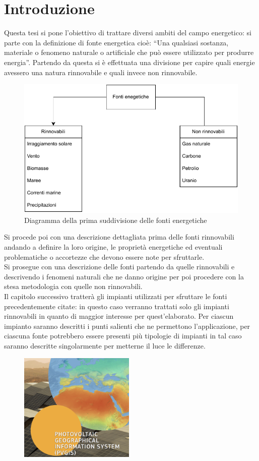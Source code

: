 
\chapter{Introduzione}
\label{chp:intro}
Questa tesi si pone l'obiettivo di trattare diversi ambiti del campo energetico: si parte con la definizione di fonte energetica cioè: \enquote{Una qualsiasi sostanza, materiale o fenomeno naturale o artificiale che può essere utilizzato per produrre energia}.
Partendo da questa si è effettuata una divisione per capire quali energie avessero una natura rinnovabile e quali invece non rinnovabile.
\begin{figure}[H]
    \centering
    \includegraphics[height=0.4\textwidth]{res/cap 1/diagramma intro}
    \caption{Diagramma della prima suddivisione delle fonti energetiche}
\end{figure}\noindent
Si procede poi con una descrizione dettagliata prima delle fonti rinnovabili andando a definire la loro origine, le proprietà energetiche ed eventuali problematiche o accortezze che devono essere note per sfruttarle.\\
Si prosegue con una descrizione delle fonti partendo da quelle rinnovabili e descrivendo i fenomeni naturali che ne danno origine per poi procedere con la stesa metodologia con quelle non rinnovabili.\\
Il capitolo successivo tratterà gli impianti utilizzati per sfruttare le fonti precedentemente citate: in questo caso verranno trattati solo gli impianti rinnovabili in quanto di maggior interesse per quest'elaborato.
Per ciascun impianto saranno descritti i punti salienti che ne permettono l'applicazione, per ciascuna fonte potrebbero essere presenti più tipologie di impianti in tal caso saranno descritte singolarmente per metterne il luce le differenze.
\newpage
\begin{figure}
\includegraphics[width=5.5cm]{res/cap 1/PVGIS tool}
\end{figure} 
